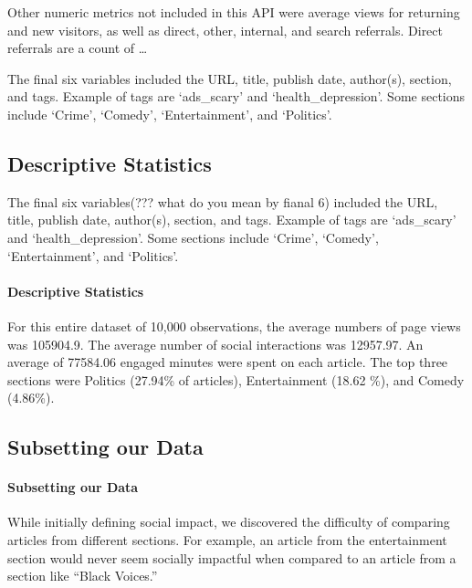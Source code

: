 \documentclass[10pt,letterpaper]{article}
\begin{document}
Other numeric metrics not included in this API were average views for
returning and new visitors, as well as direct, other, internal, and
search referrals. Direct referrals are a count of \ldots{}


The final six variables included the URL, title, publish date,
author(s), section, and tags. Example of tags are `ads\_scary' and
`health\_depression'. Some sections include `Crime', `Comedy',
`Entertainment', and `Politics'.

\subsection{Descriptive Statistics}\label{descriptive-statistics}

The final six variables(??? what do you mean by fianal 6) included the
URL, title, publish date, author(s), section, and tags. Example of tags
are `ads\_scary' and `health\_depression'. Some sections include
`Crime', `Comedy', `Entertainment', and `Politics'.

\hypertarget{descriptive-statistics}{%
\paragraph{Descriptive Statistics}\label{descriptive-statistics}}


For this entire dataset of 10,000 observations, the average numbers of
page views was 105904.9. The average number of social interactions was
12957.97. An average of 77584.06 engaged minutes were spent on each
article. The top three sections were Politics (27.94\% of articles),
Entertainment (18.62 \%), and Comedy (4.86\%).


\subsection{Subsetting our Data}\label{subsetting-our-data}

\hypertarget{subsetting-our-data}{%
\paragraph{Subsetting our Data}\label{subsetting-our-data}}

While initially defining social impact, we discovered the difficulty of
comparing articles from different sections. For example, an article from
the entertainment section would never seem socially impactful when
compared to an article from a section like ``Black Voices.''
\end{document}

